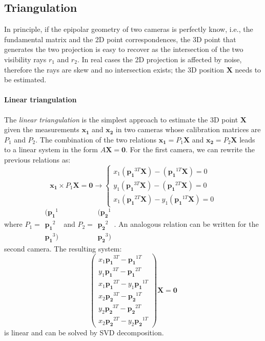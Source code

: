 \subsection{Triangulation}
In principle, if the epipolar geometry of two cameras is perfectly know, i.e., the fundamental matrix and the 2D point correspondences, the 3D point that generates the two projection is easy to recover as the intersection of the two visibility rays $r_1$ and $r_2$. 
In real cases the 2D projection is affected by noise, therefore the rays are skew and no intersection exists; the 3D position $\mathbf{X}$ needs to be estimated.

\paragraph{Linear triangulation} 
The \emph{linear triangulation} is the simplest approach to estimate the 3D point $\mathbf{X}$ given the measurements $\mathbf{x_1}$ and $\mathbf{x_2}$ in two cameras whose calibration matrices are $P_1$ and $P_2$.
The combination of the two relations $\mathbf{x_1} = P_1 \mathbf{X}$ and $\mathbf{x_2} = P_2 \mathbf{X}$ leads to a linear system in the form $A\mathbf{X} = \mathbf{0}$. 
For the first camera, we can rewrite the previous relations as:
\begin{equation}
  \mathbf{x_1} \times P_1 \mathbf{X} = \mathbf{0} \rightarrow 
  \begin{cases}
    x_1(\mathbf{p_1}^{3T}\mathbf{X}) -    (\mathbf{p_1}^{1T}\mathbf{X}) = 0\\
    y_1(\mathbf{p_1}^{3T}\mathbf{X}) -    (\mathbf{p_1}^{2T}\mathbf{X}) = 0\\
    x_1(\mathbf{p_1}^{2T}\mathbf{X}) - y_1(\mathbf{p_1}^{1T}\mathbf{X}) = 0
  \end{cases}
\end{equation}
where $P_1 = \begin{smallmatrix}(\mathbf{p_1}^1 \\ \mathbf{p_1}^2\\ \mathbf{p_1}^3)\end{smallmatrix}$ and $P_2 = \begin{smallmatrix}(\mathbf{p_2}^1 \\ \mathbf{p_2}^2\\ \mathbf{p_2}^3)\end{smallmatrix}$.
An analogous relation can be written for the second camera.
The resulting system:
\begin{equation}
  \begin{pmatrix}
    x_1\mathbf{p_1}^{3T} -    \mathbf{p_1}^{1T}\\
    y_1\mathbf{p_1}^{3T} -    \mathbf{p_1}^{2T}\\
    x_1\mathbf{p_1}^{2T} - y_1\mathbf{p_1}^{1T}\\
    x_2\mathbf{p_2}^{3T} -    \mathbf{p_2}^{1T}\\
    y_2\mathbf{p_2}^{3T} -    \mathbf{p_2}^{2T}\\
    x_2\mathbf{p_2}^{2T} - y_2\mathbf{p_2}^{1T}
  \end{pmatrix}
  \mathbf{X} = \mathbf{0}
\end{equation}
is linear and can be solved by SVD decomposition.

